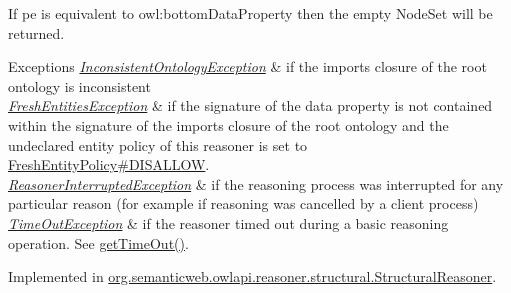 If {\ttfamily pe} is equivalent to {\ttfamily owl\-:bottom\-Data\-Property} then the empty {\ttfamily Node\-Set} will be returned.


\begin{DoxyExceptions}{Exceptions}
{\em \hyperlink{classorg_1_1semanticweb_1_1owlapi_1_1reasoner_1_1_inconsistent_ontology_exception}{Inconsistent\-Ontology\-Exception}} & if the imports closure of the root ontology is inconsistent \\
\hline
{\em \hyperlink{classorg_1_1semanticweb_1_1owlapi_1_1reasoner_1_1_fresh_entities_exception}{Fresh\-Entities\-Exception}} & if the signature of the data property is not contained within the signature of the imports closure of the root ontology and the undeclared entity policy of this reasoner is set to \hyperlink{enumorg_1_1semanticweb_1_1owlapi_1_1reasoner_1_1_fresh_entity_policy_a762eae6d5b2449d125311ecaabfdc8d0}{Fresh\-Entity\-Policy\#\-D\-I\-S\-A\-L\-L\-O\-W}. \\
\hline
{\em \hyperlink{classorg_1_1semanticweb_1_1owlapi_1_1reasoner_1_1_reasoner_interrupted_exception}{Reasoner\-Interrupted\-Exception}} & if the reasoning process was interrupted for any particular reason (for example if reasoning was cancelled by a client process) \\
\hline
{\em \hyperlink{classorg_1_1semanticweb_1_1owlapi_1_1reasoner_1_1_time_out_exception}{Time\-Out\-Exception}} & if the reasoner timed out during a basic reasoning operation. See \hyperlink{interfaceorg_1_1semanticweb_1_1owlapi_1_1reasoner_1_1_o_w_l_reasoner_a44b2c968f989afe5290db29c90faa164}{get\-Time\-Out()}. \\
\hline
\end{DoxyExceptions}


Implemented in \hyperlink{classorg_1_1semanticweb_1_1owlapi_1_1reasoner_1_1structural_1_1_structural_reasoner_a07a890369477c086b83381f4c423fbe6}{org.\-semanticweb.\-owlapi.\-reasoner.\-structural.\-Structural\-Reasoner}.

